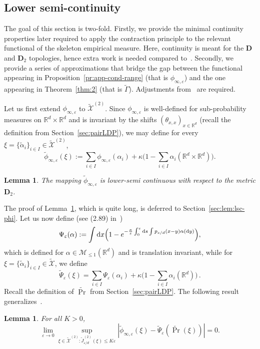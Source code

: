 \documentclass[a4paper,11pt]{amsart}
\numberwithin{equation}{section}
\newtheorem{lemma}[theorem]{Lemma}
\newcommand{\bbR}{{\ensuremath{\mathbb R}} }
\newcommand{\cM}{{\ensuremath{\mathcal M}} }
\newcommand{\cX}{{\ensuremath{\mathcal X}} }
\newcommand{\ga}{\alpha}
\newcommand{\gep}{\varepsilon}
\newcommand{\gt}{\theta}
\newcommand{\gk}{\kappa}
\newcommand{\bfD}{\mathbf{D}}
\renewcommand{\tilde}{\widetilde}          %
\newcommand{\dd}{\text{\rm d}}             %
\newcommand{\R}{\mathbb{R}}
\newcommand{\8}{\infty}
\newcommand{\beq}{\begin{equation}}
\newcommand{\eeq}{\end{equation}}
\begin{document}
\subsection{Lower semi-continuity}
\label{sec:lsc}
The goal of this section is two-fold. Firstly, we provide the minimal continuity properties later required to apply the contraction principle to the relevant functional of the skeleton empirical measure. Here, continuity is meant for the $\bfD$ and $\bfD_2$ topologies, hence extra work is needed compared to~\cite{Phetpradap, BBH2001}. Secondly, we provide a series of approximations that bridge the gap between the functional appearing in Proposition~\ref{pr:app-cond-range} (that is $\phi_{\infty,\gep}$) and the one appearing in Theorem~\ref{thm:2} (that is $\tilde \Gamma$). Adjustments from~\cite{Phetpradap, BBH2001} are required.
%
\par Let us first extend $\phi_{\infty,\gep}$ to $\tilde \cX^{(2)}$. Since $\phi_{\infty,\gep}$ is well-defined for sub-probability measures on $\bbR^d \times \bbR^d$ and is invariant by the shifts $(\gt_{x,x})_{x\in\R^d}$ (recall the definition from Section~\ref{sec:pairLDP}), we may define for every $\xi = \{\tilde \ga_i\}_{i\in I}\in \tilde\cX^{(2)}$,
\beq
 \tilde \phi_{\infty,\gep}(\xi) := \sum_{i\in I} \phi_{\infty,\gep}(\ga_i) + \kappa \Big(1-\sum_{i\in I} \ga_i(\bbR^d\times\bbR^d)\Big).
\eeq
%
\begin{lemma}
\label{lem:lsc-phi}
The mapping $\tilde \phi_{\infty,\gep}$ is lower-semi continuous with respect to the metric $\bfD_2$.
\end{lemma}
%
The proof of Lemma~\ref{lem:lsc-phi}, which is quite long, is deferred to Section~\ref{sec:lem:lsc-phi}.
%
Let us now define (see (2.89) in~\cite{BBH2001})
\beq
\Psi_{\gep}(\ga) := \int \dd x
\Big(%
1- e^{-\frac{\gk}{\gep}\int_0^\gep \dd s \int p_{ s/d}(x-y)\ga(\dd y)}
\Big),%
\eeq
which is defined for $\ga \in \cM_{\le 1}(\bbR^d)$ and is translation invariant, while for $\xi =\{\tilde\ga_i\}_{i\in I}\in\tilde\cX$, we define
\beq
\tilde\Psi_{\gep}(\xi) = \sum_{i\in I} \Psi_\gep(\ga_i)  + \gk \Big(1- \sum_{i\in I} \ga_i(\bbR^d) \Big)
\,.
\eeq
%
Recall the definition of $\tilde\Pr$ from Section~\ref{sec:pairLDP}. The following result generalizes~\cite[Lemma~6]{BBH2001}. 
\begin{lemma}
\label{lem:Psieps-to-gamma-tilt}
For all $K>0$,
\beq
\lim_{\gep\to 0}
\sup_{\xi \in \tilde\cX^{(2)}\colon \tilde J^{(2)}_{ \gep/d}(\xi)\le K\gep} 
|\tilde \phi_{\infty,\gep}(\xi)-\tilde\Psi_\gep(\tilde\Pr(\xi))| = 0.
\eeq
\end{lemma}
\end{document}
